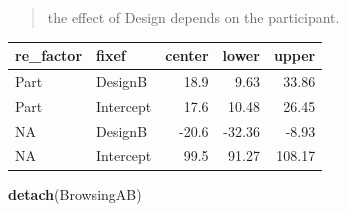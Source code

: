 \documentclass[]{svmono}
\newenvironment{Shaded}{\begin{snugshade}}{\end{snugshade}}
\newcommand{\KeywordTok}[1]{\textcolor[rgb]{0.13,0.29,0.53}{\textbf{#1}}}
\newcommand{\DataTypeTok}[1]{\textcolor[rgb]{0.13,0.29,0.53}{#1}}
\newcommand{\DecValTok}[1]{\textcolor[rgb]{0.00,0.00,0.81}{#1}}
\newcommand{\StringTok}[1]{\textcolor[rgb]{0.31,0.60,0.02}{#1}}
\newcommand{\OperatorTok}[1]{\textcolor[rgb]{0.81,0.36,0.00}{\textbf{#1}}}
\newcommand{\NormalTok}[1]{#1}
\theoremstyle{definition}
\theoremstyle{definition}
\theoremstyle{definition}
\theoremstyle{remark}
\begin{document}
\begin{quote}
the effect of Design depends on the participant.
\end{quote}

\begin{Shaded}
\end{Shaded}

\begin{tabular}{l|l|r|r|r}
\hline
re\_factor & fixef & center & lower & upper\\
\hline
Part & DesignB & 18.9 & 9.63 & 33.86\\
\hline
Part & Intercept & 17.6 & 10.48 & 26.45\\
\hline
NA & DesignB & -20.6 & -32.36 & -8.93\\
\hline
NA & Intercept & 99.5 & 91.27 & 108.17\\
\hline
\end{tabular}

\begin{Shaded}
\begin{Highlighting}[]
\KeywordTok{detach}\NormalTok{(BrowsingAB)}
\end{Highlighting}
\end{Shaded}
\end{document}
